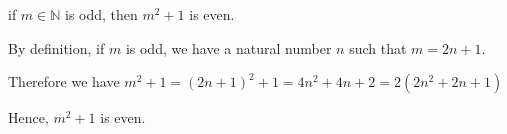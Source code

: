 if $m \in \mathbb{N}$ is odd, then $m^2 + 1$ is even.

By definition, if $m$ is odd, we have a natural number $n$ such that $m = 2n + 1$.

Therefore we have $m^2 + 1 = (2n + 1)^2 + 1 = 4n ^ 2 + 4n + 2 = 2 (2n^2 + 2n + 1)$

Hence, $m^2 + 1$ is even.